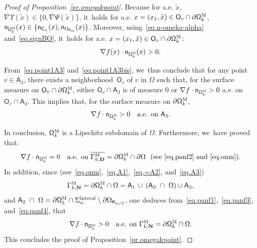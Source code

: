 \documentclass[JEP,XML,SOM,Unicode,NoEqCountersInSection,NoFloatCountersInSection,published]{cedram}
\newcommand{\mbf}[1]{\mathbf{#1}}
\let\pa\partial
\theoremstyle{plain}
\theoremstyle{definition}
\begin{document}
\begin{proof}[Proof of Proposition~\ref{pr.omegakpoint}]
Because for a.e. $\tilde x$, $\nabla \Upsilon (\tilde x)\in \{0,\nabla \Psi(\tilde x)\}$, it~holds for a.e. $x=(x_1,\tilde x)\in \mathsf O_v\cap \pa \mathsf \Omega_k^{\textsc{M}}$, $\mathsf n_{\mathsf \Omega_k^{\textsc{M}}}(x)\in \{ \mathsf n_{ \mathsf C_\alpha }(x), \mathsf n_{ \Omega_{\mathsf K_\alpha} }(x)\}$.
Moreover, using~\eqref{eq.n-omeka-alpha} and~\eqref{eq.signBO}, it~holds for a.e. $x=(x_1,\tilde x)\in \mathsf O_v\cap \pa \mathsf \Omega_k^{\textsc{M}}$:
\begin{equation}\label{eq.point1A3bis}
\nabla f(x)\cdot \mathsf n_{\mathsf \Omega_k^{\textsc{M}}}(x)>0.
\end{equation}

From~\eqref{eq.point1A3} and~\eqref{eq.point1A3bis}, we~thus conclude
that for any point $v \in \mathsf A_3$, there exists a neighborhood~$\mathsf O_v$ of $v$ in $\Omega$ such that, for the surface measure on $\mathsf O_v\cap \pa \mathsf \Omega_k^{\textsc{M}} $, either $\mathsf O_v \cap \mathsf A_3$ is of measure $0$ or
$\nabla f\cdot \mathsf n_{ \mathsf \Omega_k^{\textsc{M}}}>0$
a.e. on $\mathsf O_v \cap \mathsf A_3$.
This implies that, for the surface measure on $\pa \mathsf \Omega_k^{\textsc{M}} $,
\begin{equation}\label{eq.panf4}
\nabla f\cdot \mathsf n_{ \mathsf \Omega_k^{\textsc{M}}}>0 \quad\text{a.e. on } \mathsf A_3.
\end{equation}

In conclusion, $\mathsf \Omega_k^{\textsc{M}}$ is a Lipschitz subdomain of $\Omega$. Furthermore, we~have proved that:
\[
\nabla f\cdot \mathsf n_{ \mathsf \Omega_k^{\textsc{M}}}=0\quad\text{a.e. on } \overline{\Gamma_{k,\mbf D}^{\textsc{M}} }=\pa \mathsf \Omega_k^{\textsc{M}}\cap \partial \Omega \ \text{ (see~\eqref{eq.panf2} and~\eqref{eq.onm})}.
\]
In addition, since (see~\eqref{eq.onm},~\eqref{eq.A1},~\eqref {eq.=A2}, and~\eqref{eq.A3})
\[
\Gamma_{k,\mbf N}^{\textsc{M}}=\pa \mathsf \Omega_k^{\textsc{M}}\cap \Omega= \mathsf A_1\, \cup\, (\mathsf A_2\ \cap \ \Omega) \cup \mathsf A_3,
\]
and $\mathsf A_2\ \cap \ \Omega=\pa \mathsf \Omega_k^{\textsc{M}}
\cap {\Sigma_\alpha^{\textup{lateral}} }\setminus \partial \Omega_{\mathsf
K_{\alpha/2}} $, one deduces from~\eqref{eq.panf1},~\eqref{eq.panf3}, and~\eqref{eq.panf4}, that
\[
\nabla f\cdot \mathsf n_{ \mathsf \Omega_k^{\textsc{M}}}>0\quad\text{a.e. on } \Gamma_{k,\mbf N}^{\textsc{M}}=\pa \mathsf \Omega_k^{\textsc{M}}\cap \Omega.
\]
This concludes the proof of Proposition~\ref{pr.omegakpoint}.
\end{proof}
\end{document}
